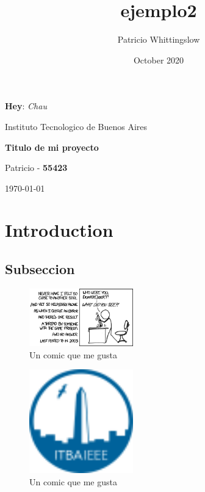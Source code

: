 \documentclass[titlepage]{article}
\title{ejemplo2}
\author{Patricio Whittingslow}
\date{October 2020}
\newcommand{\hey}[2]{\textbf{#1}: \textit{#2} }
\begin{document}
\begin{titlepage}
\centering

\hey{Hey}{Chau}

{\sc Instituto Tecnologico de Buenos Aires \par}

\vspace{20mm}

{\Huge \bf Titulo de mi proyecto \par}
\vspace{30mm}
{ \large Patricio - {\bf 55423} \par}
\vspace{30mm}
{ \today \par }

\end{titlepage}

\tableofcontents

\section{Introduction}
\subsection{Subseccion }
\begin{figure}
    \centering
    \includegraphics[width=0.4\textwidth]{fig/comic.png}
    \caption{Un comic que me gusta}
    \label{fig:primer_comic}
\end{figure}

\begin{figure}[h!]
    \centering
    \includegraphics[width=0.4\textwidth]{fig2}
    \caption{Un comic que me gusta}
    \label{fig:primer_comic}
\end{figure}
\end{document}
